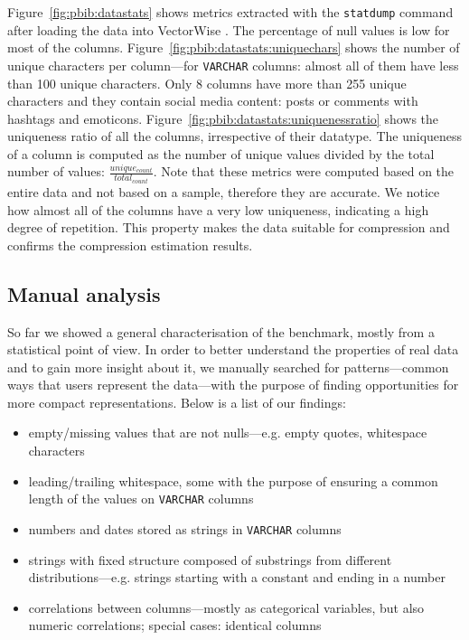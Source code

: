 Figure~\ref{fig:pbib:datastats} shows metrics extracted with the \verb|statdump| command after loading the data into VectorWise \cite{zukowski2012vectorwise}. The percentage of null values is low for most of the columns. Figure~\ref{fig:pbib:datastats:uniquechars} shows the number of unique characters per column---for \verb|VARCHAR| columns: almost all of them have less than 100 unique characters. Only 8 columns have more than 255 unique characters and they contain social media content: posts or comments with hashtags and emoticons. Figure~\ref{fig:pbib:datastats:uniquenessratio} shows the uniqueness ratio of all the columns, irrespective of their datatype. The uniqueness of a column is computed as the number of unique values divided by the total number of values: \(\frac{unique_{count}}{total_{count}}\). Note that these metrics were computed based on the entire data and not based on a sample, therefore they are accurate. We notice how almost all of the columns have a very low uniqueness, indicating a high degree of repetition. This property makes the data suitable for compression and confirms the compression estimation results.

\subsection{Manual analysis}
So far we showed a general characterisation of the benchmark, mostly from a statistical point of view. In order to better understand the properties of real data and to gain more insight about it, we manually searched for patterns---common ways that users represent the data---with the purpose of finding opportunities for more compact representations. Below is a list of our findings:

\begin{itemize}

    \item empty/missing values that are not nulls---e.g. empty quotes, whitespace characters
    \item leading/trailing whitespace, some with the purpose of ensuring a common length of the values on \verb|VARCHAR| columns
    \item numbers and dates stored as strings in \verb|VARCHAR| columns
    \item strings with fixed structure composed of substrings from different distributions---e.g. strings starting with a constant and ending in a number
    \item correlations between columns---mostly as categorical variables, but also numeric correlations; special cases: identical columns
\end{itemize}

